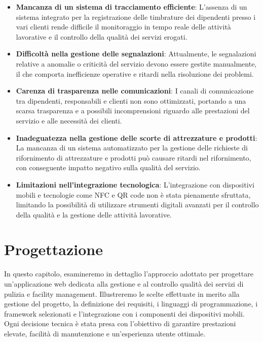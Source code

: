\documentclass[twoside]{supsistudent}
\begin{document}
\begin{itemize}
  \item \textbf{Mancanza di un sistema di tracciamento efficiente}: L'assenza di un sistema integrato per la registrazione delle timbrature dei dipendenti presso i vari clienti rende difficile il monitoraggio in tempo reale delle attività lavorative e il controllo della qualità dei servizi erogati.

  \item \textbf{Difficoltà nella gestione delle segnalazioni}: Attualmente, le segnalazioni relative a anomalie o criticità del servizio devono essere gestite manualmente, il che comporta inefficienze operative e ritardi nella risoluzione dei problemi.

  \item \textbf{Carenza di trasparenza nelle comunicazioni}: I canali di comunicazione tra dipendenti, responsabili e clienti non sono ottimizzati, portando a una scarsa trasparenza e a possibili incomprensioni riguardo alle prestazioni del servizio e alle necessità dei clienti.

  \item \textbf{Inadeguatezza nella gestione delle scorte di attrezzature e prodotti}: La mancanza di un sistema automatizzato per la gestione delle richieste di rifornimento di attrezzature e prodotti può causare ritardi nel rifornimento, con conseguente impatto negativo sulla qualità del servizio.

  \item \textbf{Limitazioni nell'integrazione tecnologica}: L'integrazione con dispositivi mobili e tecnologie come NFC e QR code non è stata pienamente sfruttata, limitando la possibilità di utilizzare strumenti digitali avanzati per il controllo della qualità e la gestione delle attività lavorative.

\end{itemize}

\chapter{Progettazione}
In questo capitolo, esamineremo in dettaglio l'approccio adottato per progettare un'applicazione web dedicata alla gestione e al controllo qualità dei servizi di pulizia e facility management. Illustreremo le scelte effettuate in merito alla gestione del progetto, la definizione dei requisiti, i linguaggi di programmazione, i framework selezionati e l'integrazione con i componenti dei dispositivi mobili. Ogni decisione tecnica è stata presa con l'obiettivo di garantire prestazioni elevate, facilità di manutenzione e un'esperienza utente ottimale.
\end{document}
